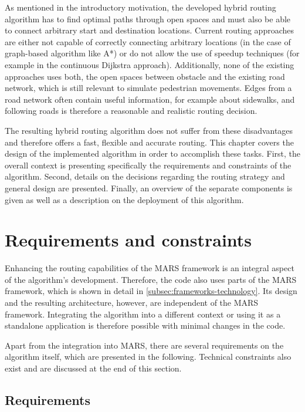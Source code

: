 
As mentioned in the introductory motivation, the developed hybrid routing algorithm has to find optimal paths through open spaces and must also be able to connect arbitrary start and destination locations.
Current routing approaches are either not capable of correctly connecting arbitrary locations (in the case of graph-based algorithm like A*) or do not allow the use of speedup techniques (for example in the continuous Dijkstra approach).
Additionally, none of the existing approaches uses both, the open spaces between obstacle and the existing road network, which is still relevant to simulate pedestrian movements.
Edges from a road network often contain useful information, for example about sidewalks, and following roads is therefore a reasonable and realistic routing decision.

The resulting hybrid routing algorithm does not suffer from these disadvantages and therefore offers a fast, flexible and accurate routing.
This chapter covers the design of the implemented algorithm in order to accomplish these tasks.
First, the overall context is presenting specifically the requirements and constraints of the algorithm.
Second, details on the decisions regarding the routing strategy and general design are presented.
Finally, an overview of the separate components is given as well as a description on the deployment of this algorithm.

\section{Requirements and constraints}
	
	Enhancing the routing capabilities of the MARS framework is an integral aspect of the algorithm's development.
	Therefore, the code also uses parts of the MARS framework, which is shown in detail in \cref{subsec:frameworks-technology}.
	Its design and the resulting architecture, however, are independent of the MARS framework.
	Integrating the algorithm into a different context or using it as a standalone application is therefore possible with minimal changes in the code.
	
	Apart from the integration into MARS, there are several requirements on the algorithm itself, which are presented in the following.
	Technical constraints also exist and are discussed at the end of this section.
	
	\subsection{Requirements}
	
